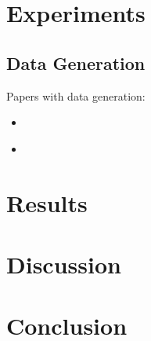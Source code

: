 \documentclass[11pt]{extarticle}
\begin{document}
\section{Experiments}

\subsection{Data Generation}

Papers with data generation:
\begin{itemize}
  \item \cite{austin_optimal_2011}
  \item \cite{stuart_prognostic_2013}
\end{itemize}

\section{Results}

\section{Discussion}

\section{Conclusion}


\cleardoublepage
{}
{}
\printbibliography
\end{document}
